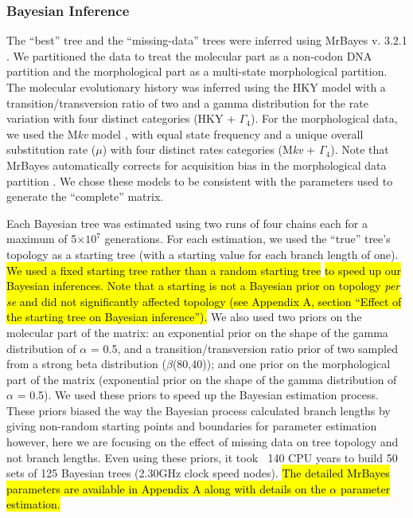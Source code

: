 \documentclass[12pt,letterpaper]{article}
\begin{document}
\subsubsection{Bayesian Inference}
The ``best'' tree and the ``missing-data'' trees were inferred using MrBayes v. 3.2.1 \citep{Ronquist2012mrbayes}.
We partitioned the data to treat the molecular part as a non-codon DNA partition and the morphological part as a multi-state morphological partition.
The molecular evolutionary history was inferred using the HKY model with a transition/transversion ratio of two \citep{douadycomparison2003} and a gamma distribution for the rate variation with four distinct categories (HKY + $\Gamma_4$).
For the morphological data, we used the M\textit{kv} model \citep{lewisa2001}, with equal state frequency and a unique overall substitution rate ($\mu$) with four distinct rates categories (M\textit{kv} + $\Gamma_4$).
Note that MrBayes automatically corrects for acquisition bias in the morphological data partition \citep{Nylander01022004,Ronquist2012mrbayes}.
We chose these models to be consistent with the parameters used to generate the ``complete'' matrix.

Each Bayesian tree was estimated using two runs of four chains each for a maximum of 5$\times$$10^7$ generations.
For each estimation, we used the ``true'' tree's topology as a starting tree (with a starting value for each branch length of one).
\hl{We used a fixed starting tree rather than a random starting tree} \citep[\hl{default MrBayes;}][]{Ronquist2012mrbayes} \hl{to speed up our Bayesian inferences.
Note that a starting is not a Bayesian prior on topology \textit{per se} and did not significantly affected topology (see Appendix A, section ``Effect of the starting tree on Bayesian inference'').}
We also used two priors on the molecular part of the matrix: an exponential prior on the shape of the gamma distribution of $\alpha$ = 0.5, and a transition/transversion ratio prior of two sampled from a strong beta distribution ($\beta$(80,40)); and one prior on the morphological part of the matrix (exponential prior on the shape of the gamma distribution of $\alpha$ = 0.5).
We used these priors to speed up the Bayesian estimation process.
These priors biased the way the Bayesian process calculated branch lengths by giving non-random starting points and boundaries for parameter estimation however, here we are focusing on the effect of missing data on tree topology and not branch lengths.
Even using these priors, it took $~$ 140 CPU years to build 50 sets of 125 Bayesian trees (2.30GHz clock speed nodes).
\hl{The detailed MrBayes parameters are available in Appendix A along with details on the $\alpha$ parameter estimation.}
\end{document}
